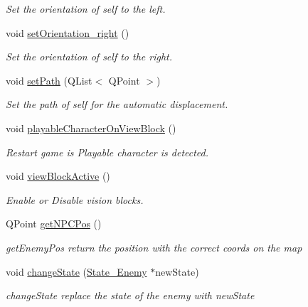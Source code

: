 \begin{DoxyCompactItemize}
\begin{DoxyCompactList}\small\item\em Set the orientation of self to the left. \end{DoxyCompactList}\item 
\hypertarget{class_c___enemy_ad2f5268b729e05adee521de5ffb01efc}{}void \hyperlink{class_c___enemy_ad2f5268b729e05adee521de5ffb01efc}{set\+Orientation\+\_\+right} ()\label{class_c___enemy_ad2f5268b729e05adee521de5ffb01efc}

\begin{DoxyCompactList}\small\item\em Set the orientation of self to the right. \end{DoxyCompactList}\item 
\hypertarget{class_c___enemy_a383e552dc387e09be4314520f0da1156}{}void \hyperlink{class_c___enemy_a383e552dc387e09be4314520f0da1156}{set\+Path} (Q\+List$<$ Q\+Point $>$)\label{class_c___enemy_a383e552dc387e09be4314520f0da1156}

\begin{DoxyCompactList}\small\item\em Set the path of self for the automatic displacement. \end{DoxyCompactList}\item 
void \hyperlink{class_c___enemy_a796f1345db2284141b037cdbf6d888d2}{playable\+Character\+On\+View\+Block} ()
\begin{DoxyCompactList}\small\item\em Restart game is Playable character is detected. \end{DoxyCompactList}\item 
\hypertarget{class_c___enemy_aac37e506f7408bd4b3aa0ba82beb853f}{}void \hyperlink{class_c___enemy_aac37e506f7408bd4b3aa0ba82beb853f}{view\+Block\+Active} ()\label{class_c___enemy_aac37e506f7408bd4b3aa0ba82beb853f}

\begin{DoxyCompactList}\small\item\em Enable or Disable vision blocks. \end{DoxyCompactList}\item 
Q\+Point \hyperlink{class_c___enemy_a3d6fe05b8f728777a5696d485f6e512a}{get\+N\+P\+C\+Pos} ()
\begin{DoxyCompactList}\small\item\em get\+Enemy\+Pos return the position with the correct coords on the map \end{DoxyCompactList}\item 
void \hyperlink{class_c___enemy_ad6d010c0c1592beb687eb36e71d9978e}{change\+State} (\hyperlink{class_state___enemy}{State\+\_\+\+Enemy} $\ast$new\+State)
\begin{DoxyCompactList}\small\item\em change\+State replace the state of the enemy with new\+State \end{DoxyCompactList}\end{DoxyCompactItemize}
